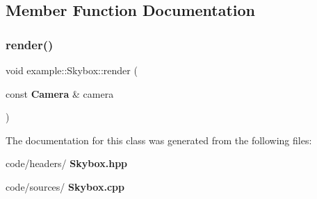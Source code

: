 \subsection{Member Function Documentation}
\mbox{\label{classexample_1_1_skybox_a0f6edb0a0b5b81cb31c55b9207a82ad6}} 
\subsubsection{render()}
{\footnotesize\ttfamily void example\+::\+Skybox\+::render (\begin{DoxyParamCaption}\item[{const \textbf{ Camera} \&}]{camera }\end{DoxyParamCaption})}



The documentation for this class was generated from the following files\+:\begin{DoxyCompactItemize}
\item 
code/headers/\textbf{ Skybox.\+hpp}\item 
code/sources/\textbf{ Skybox.\+cpp}\end{DoxyCompactItemize}
